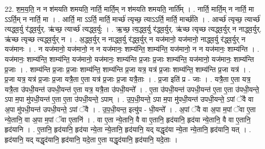 \documentclass[17pt]{extarticle}
\begin{document}
22. श॒म॒य॒ति॒ न न श॑मयति शमयति॒ नार्ति॒ मार्ति॒म् न श॑मयति शमयति॒ नार्ति᳚म् । . नार्ति॒ मार्ति॒म् न नार्ति॒ मा ऽऽर्ति॒म् न नार्ति॒ मा । . आर्ति॒ मा ऽऽर्ति॒ मार्ति॒ मार्च्छ॑ त्यृच्छ॒ त्याऽऽर्ति॒ मार्ति॒ मार्च्छ॑ति । . आर्च्छ॑ त्यृच्छ॒ त्यार्च्छ॑ त्यद्ध्व॒र्यु र॑द्ध्व॒र्युर्. ऋ॑च्छ॒ त्यार्च्छ॑ त्यद्ध्व॒र्युः । . ऋ॒च्छ॒ त्य॒द्ध्व॒र्यु र॑द्ध्व॒र्युर्. ऋ॑च्छ त्यृच्छ त्यद्ध्व॒र्युर् न नाद्ध्व॒र्युर्. ऋ॑च्छ त्यृच्छ त्यद्ध्व॒र्युर् न । . अ॒द्ध्व॒र्युर् न नाद्ध्व॒र्यु र॑द्ध्व॒र्युर् न यज॑मानो॒ यज॑मानो॒ नाद्ध्व॒र्यु र॑द्ध्व॒र्युर् न यज॑मानः । . न यज॑मानो॒ यज॑मानो॒ न न यज॑मानः॒ शाम्य॑न्ति॒ शाम्य॑न्ति॒ यज॑मानो॒ न न यज॑मानः॒ शाम्य॑न्ति । . यज॑मानः॒ शाम्य॑न्ति॒ शाम्य॑न्ति॒ यज॑मानो॒ यज॑मानः॒ शाम्य॑न्ति प्र॒जाः प्र॒जाः शाम्य॑न्ति॒ यज॑मानो॒ यज॑मानः॒ शाम्य॑न्ति प्र॒जाः । . शाम्य॑न्ति प्र॒जाः प्र॒जाः शाम्य॑न्ति॒ शाम्य॑न्ति प्र॒जा यत्र॒ यत्र॑ प्र॒जाः शाम्य॑न्ति॒ शाम्य॑न्ति प्र॒जा यत्र॑ । . प्र॒जा यत्र॒ यत्र॑ प्र॒जाः प्र॒जा यत्रै॒ता ए॒ता यत्र॑ प्र॒जाः प्र॒जा यत्रै॒ताः । . प्र॒जा इति॑ प्र - जाः । . यत्रै॒ता ए॒ता यत्र॒ यत्रै॒ता उ॑पधी॒यन्त॑ उपधी॒यन्त॑ ए॒ता यत्र॒ यत्रै॒ता उ॑पधी॒यन्ते᳚ । . ए॒ता उ॑पधी॒यन्त॑ उपधी॒यन्त॑ ए॒ता ए॒ता उ॑पधी॒यन्ते॒ ऽपा म॒पा मु॑पधी॒यन्त॑ ए॒ता ए॒ता उ॑पधी॒यन्ते॒ ऽपाम् । . उ॒प॒धी॒यन्ते॒ ऽपा म॒पा मु॑पधी॒यन्त॑ उपधी॒यन्ते॒ ऽपां ॅवै वा अ॒पा मु॑पधी॒यन्त॑ उपधी॒यन्ते॒ ऽपां ॅवै । . उ॒प॒धी॒यन्त॒ इत्यु॑प - धी॒यन्ते᳚ । . अ॒पां ॅवै वा अ॒पा म॒पां ॅवा ए॒ता न्ये॒तानि॒ वा अ॒पा म॒पां ॅवा ए॒तानि॑ । . वा ए॒ता न्ये॒तानि॒ वै वा ए॒तानि॒ हृद॑यानि॒ हृद॑या न्ये॒तानि॒ वै वा ए॒तानि॒ हृद॑यानि । . ए॒तानि॒ हृद॑यानि॒ हृद॑या न्ये॒ता न्ये॒तानि॒ हृद॑यानि॒ यद् यद्धृद॑या न्ये॒ता न्ये॒तानि॒ हृद॑यानि॒ यत् । . हृद॑यानि॒ यद् यद्धृद॑यानि॒ हृद॑यानि॒ यदे॒ता ए॒ता यद्धृद॑यानि॒ हृद॑यानि॒ यदे॒ताः । \newline
\end{document}
